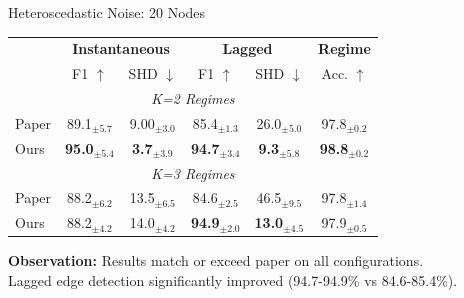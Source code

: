 \documentclass[aspectratio=169]{beamer}
\begin{document}
\begin{frame}{Heteroscedastic Noise: 20 Nodes}
\begin{table}
\centering
\small
\begin{tabular}{l|cc|cc|c}
\toprule
& \multicolumn{2}{c|}{\textbf{Instantaneous}} & \multicolumn{2}{c|}{\textbf{Lagged}} & \textbf{Regime} \\
& F1 $\uparrow$ & SHD $\downarrow$ & F1 $\uparrow$ & SHD $\downarrow$ & Acc. $\uparrow$ \\
\midrule
\multicolumn{6}{c}{\textit{K=2 Regimes}} \\
\midrule
\rowcolor{lightgray} Paper & 89.1$_{\pm5.7}$ & 9.00$_{\pm3.0}$ & 85.4$_{\pm1.3}$ & 26.0$_{\pm5.0}$ & 97.8$_{\pm0.2}$ \\
Ours & \textcolor{reprogreen}{\textbf{95.0}$_{\pm5.4}$} & \textcolor{reprogreen}{\textbf{3.7}$_{\pm3.9}$} & \textcolor{reprogreen}{\textbf{94.7}$_{\pm3.4}$} & \textcolor{reprogreen}{\textbf{9.3}$_{\pm5.8}$} & \textcolor{reprogreen}{\textbf{98.8}$_{\pm0.2}$} \\
\midrule
\multicolumn{6}{c}{\textit{K=3 Regimes}} \\
\midrule
\rowcolor{lightgray} Paper & 88.2$_{\pm6.2}$ & 13.5$_{\pm6.5}$ & 84.6$_{\pm2.5}$ & 46.5$_{\pm9.5}$ & 97.8$_{\pm1.4}$ \\
Ours & 88.2$_{\pm4.2}$ & 14.0$_{\pm4.2}$ & \textcolor{reprogreen}{\textbf{94.9}$_{\pm2.0}$} & \textcolor{reprogreen}{\textbf{13.0}$_{\pm4.5}$} & 97.9$_{\pm0.5}$ \\
\bottomrule
\end{tabular}
\end{table}

\vspace{0.3cm}
\textcolor{reprogreen}{\textbf{Observation:}} Results match or exceed paper on all configurations. \\
Lagged edge detection significantly improved (94.7-94.9\% vs 84.6-85.4\%).
\end{frame}
\end{document}

